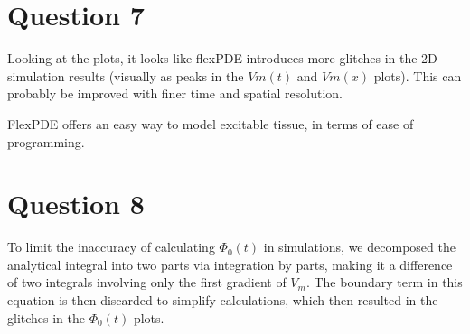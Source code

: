\documentclass{article}
\begin{document}
\section{Question 7}
Looking at the plots, it looks like flexPDE introduces more glitches in the 2D simulation results (visually as peaks in the $Vm(t)$ and $Vm(x)$ plots). This can probably be improved with finer time and spatial resolution.

FlexPDE offers an easy way to model excitable tissue, in terms of ease of programming.

\section{Question 8}
To limit the inaccuracy of calculating $\Phi_0(t)$ in simulations, we decomposed the analytical integral into two parts via integration by parts, making it a difference of two integrals involving only the first gradient of $V_m$. The boundary term in this equation is then discarded to simplify calculations, which then resulted in the glitches in the $\Phi_0(t)$ plots.
\end{document}
